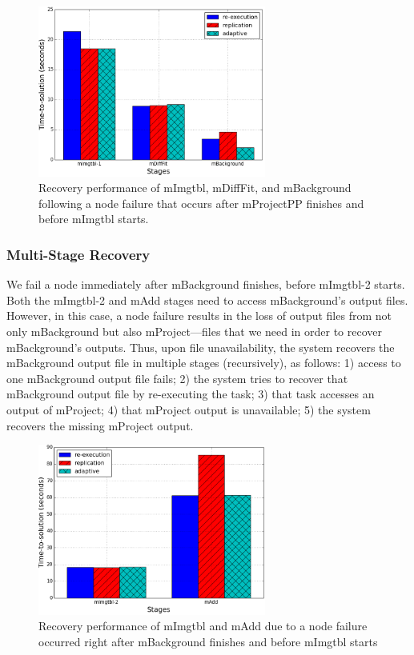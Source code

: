 \documentclass{sig-alternate}
\begin{document}
\begin{figure}[ht]
        \begin{center}
                \includegraphics[width=75mm]{pictures/kill-mProjectPP}
                \vspace{-10pt}
                \caption{Recovery performance of mImgtbl, mDiffFit, and mBackground following a node failure that occurs after mProjectPP finishes and before mImgtbl starts.
                \label{fig:montage-fail-mProjectPP}}
        \end{center}
\end{figure}

\subsubsection{Multi-Stage Recovery}
We fail a node immediately after mBackground finishes, before mImgtbl-2 starts.
Both the mImgtbl-2 and mAdd stages need to access mBackground's output files.
However, in this case, a node failure results in the loss of output files from not only mBackground but also mProject---files
that we need in order to recover mBackground's outputs.
Thus, upon file unavailability, the system recovers the mBackground output file in multiple stages (recursively), as follows:
1) access to one mBackground output file fails;
2) the system tries to recover that mBackground output file by re-executing the task;
3) that task accesses an output of mProject;
4) that mProject output is unavailable;
5) the system recovers the missing mProject output.

\begin{figure}[h]
        \begin{center}
                \includegraphics[width=75mm]{pictures/kill-mBack}
                \vspace{-10pt}
                \caption{Recovery performance of mImgtbl and mAdd due to a node failure occurred right after mBackground finishes and before mImgtbl starts
                \label{fig:montage-fail-mBackground}}
        \end{center}
\end{figure}
\end{document}
